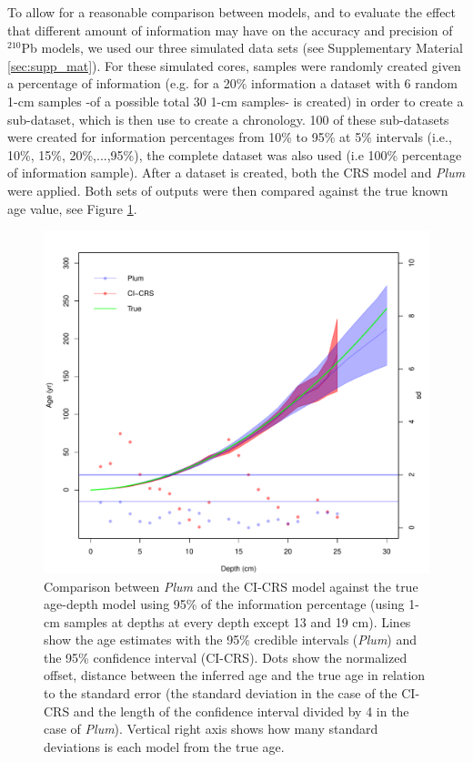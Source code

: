 \documentclass [10pt] {article}
\begin{document}
To allow for a reasonable comparison between models, and to evaluate the effect that different amount of information may have on the accuracy and precision of $^{210}$Pb models, we used our three simulated data sets (see Supplementary Material \ref{sec:supp_mat}). 
For these simulated cores, samples were randomly created given a percentage of information (e.g. for a 20\% information a dataset with 6 random 1-cm samples -of a possible total 30 1-cm samples- is created) in order to create a sub-dataset, which is then use to create a chronology. 
100 of these sub-datasets were created for information percentages from 10\% to 95\% at 5\% intervals (i.e., 10\%, 15\%, 20\%,...,95\%), the complete dataset was also used (i.e 100\% percentage of information sample).
After a dataset is created, both the CRS model and \textit{Plum} were applied.  
Both sets of outputs were then compared against the true known age value, see Figure \ref{fig:comparison1r}.

\begin{figure}[!]
	\centering
	\includegraphics[width=\linewidth]{comparison1.pdf}
		\caption{Comparison between \textit{Plum} and the CI-CRS model against the true age-depth model using 95\% of the information percentage (using 1-cm samples at depths at every depth except 13 and 19 cm). Lines show the age estimates with the 95\% credible intervals (\textit{Plum}) and the 95\% confidence interval (CI-CRS). Dots show the normalized offset, distance between the inferred age and the true age in relation to the standard error (the standard deviation in the case of the CI-CRS and the length of the confidence interval divided by 4 in the case of \textit{Plum}). Vertical right axis shows how many standard deviations is each model from the true age.  }
		\label{fig:comparison1r}
\end{figure}
\end{document}
